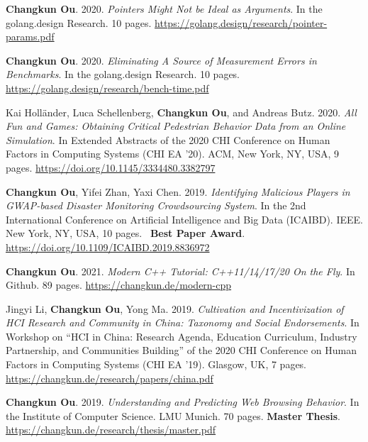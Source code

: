     \item{
        \textbf{Changkun Ou}. 2020.
        \emph{Pointers Might Not be Ideal as Arguments}.
        In the golang.design Research. 10 pages.
        \url{https://golang.design/research/pointer-params.pdf}
    }
    \item{
        \textbf{Changkun Ou}. 2020.
        \emph{Eliminating A Source of Measurement Errors in Benchmarks}.
        In the golang.design Research. 10 pages.
        \url{https://golang.design/research/bench-time.pdf}
    }
    \item{
        Kai Holländer, Luca Schellenberg, \textbf{Changkun Ou}, and Andreas Butz. 2020.
        \emph{All Fun and Games: Obtaining Critical Pedestrian Behavior Data from an Online Simulation}.
        In Extended Abstracts of the 2020 CHI Conference on Human Factors in Computing Systems (CHI EA '20). ACM, New York, NY, USA, 9 pages.
        \url{https://doi.org/10.1145/3334480.3382797}
    }
    \item{
        \textbf{Changkun Ou}, Yifei Zhan, Yaxi Chen. 2019.
        \emph{Identifying Malicious Players in GWAP-based Disaster Monitoring Crowdsourcing System}.
        In the 2nd International Conference on Artificial Intelligence and Big Data (ICAIBD). IEEE. New York, NY, USA, 10 pages. \faAward~\textbf{Best Paper Award}.
        \url{https://doi.org/10.1109/ICAIBD.2019.8836972}
    }
    \item{
        \textbf{Changkun Ou}. 2021.
        \emph{Modern C++ Tutorial: C++11/14/17/20 On the Fly}.
        In Github. 89 pages.
        \url{https://changkun.de/modern-cpp}
    }
    \item{
        Jingyi Li, \textbf{Changkun Ou}, Yong Ma. 2019.
        \emph{Cultivation and Incentivization of HCI Research and Community in China: Taxonomy and Social Endorsements}.
        In Workshop on ``HCI in China: Research Agenda, Education Curriculum, Industry Partnership, and Communities Building'' of the 2020 CHI Conference on Human Factors in Computing Systems (CHI EA '19). Glasgow, UK, 7 pages.
        \url{https://changkun.de/research/papers/china.pdf}
    }
    \item{
        \textbf{Changkun Ou}. 2019.
        \emph{Understanding and Predicting Web Browsing Behavior}.
        In the Institute of Computer Science. LMU Munich. 70 pages. \textbf{Master Thesis}.
        \url{https://changkun.de/research/thesis/master.pdf}
    }
